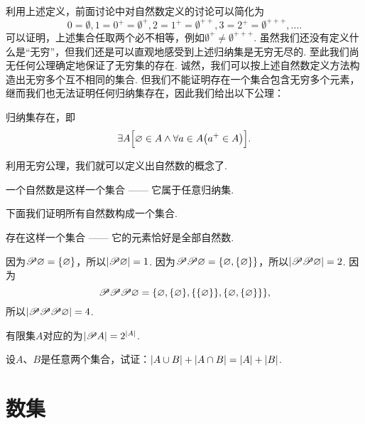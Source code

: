 利用上述定义，前面讨论中对自然数定义的讨论可以简化为\[
0 = \emptyset,
1 = 0^+ = \emptyset^+,
2 = 1^+ = \emptyset^{++},
3 = 2^+ = \emptyset^{+++},
\dotsc.
\]
可以证明，上述集合任取两个必不相等，例如\(\emptyset^+ \neq \emptyset^{+++}\).
虽然我们还没有定义什么是“无穷”，但我们还是可以直观地感受到上述归纳集是无穷无尽的.
至此我们尚无任何公理确定地保证了无穷集的存在.
诚然，我们可以按上述自然数定义方法构造出无穷多个互不相同的集合.
但我们不能证明存在一个集合包含无穷多个元素，继而我们也无法证明任何归纳集存在，因此我们给出以下公理：
\begin{axiom}[无穷公理]
归纳集存在，即\[
\exists A \Bigl[
\emptyset \in A
\land
\forall a \in A \bigl( a^+ \in A \bigr)
\Bigr].
\]
\end{axiom}

利用无穷公理，我们就可以定义出自然数的概念了.
\begin{definition}
一个自然数是这样一个集合 —— 它属于任意归纳集.
\end{definition}

下面我们证明所有自然数构成一个集合.
\begin{theorem}%
存在这样一个集合 —— 它的元素恰好是全部自然数.
\end{theorem}

因为\(\Powerset\emptyset = \{ \emptyset \}\)，所以\(\abs{\Powerset\emptyset} = 1\).
因为\(\Powerset\Powerset\emptyset = \{ \emptyset, \{ \emptyset \} \}\)，所以\(\abs{\Powerset\Powerset\emptyset} = 2\).
因为\[
\Powerset\Powerset\Powerset\emptyset = \{ %
	\emptyset,
	\{ \emptyset \},
	\{\{ \emptyset \}\},
	\{ \emptyset, \{ \emptyset \} \}
\},
\]所以\(\abs{\Powerset\Powerset\Powerset\emptyset} = 4\).

\begin{property}
有限集\(A\)对应的为\(\abs{\Powerset A} = 2^{\abs{A}}\).
\end{property}

\begin{example}
设\(A\)、\(B\)是任意两个集合，试证：\(\abs{A \cup B} + \abs{A \cap B} = \abs{A} + \abs{B}\).
\end{example}

\section{数集}
